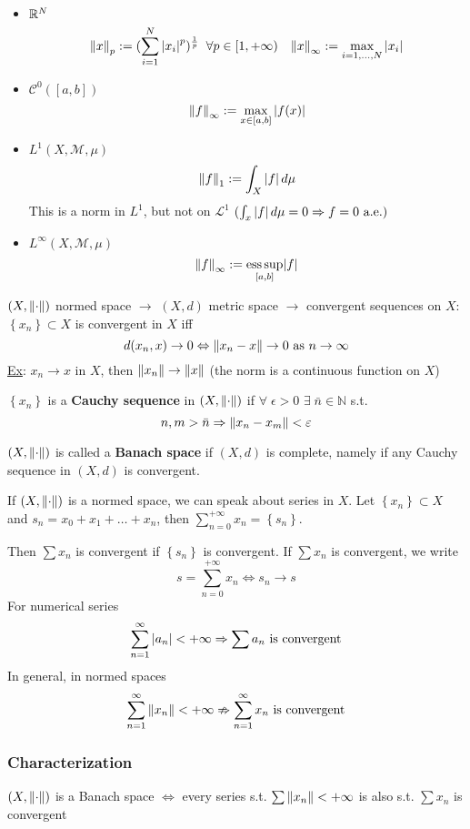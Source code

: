 \begin{itemize}
    \item \(\mathbb{R}^N\)
    \[
        \norm{x}_p := (\sum_{i = 1}^N \abs{x_i}^p)^{\frac{1}{p}} \; \; \forall p \in [1, +\infty) \quad
        \norm{x}_{\infty} := \max_{i = 1, \ldots, N} \abs{x_i}
    \]
    \item \(\mathcal{C}^0([a,b])\) \[\norm{f}_{\infty} := \max_{x \in [a,b]} \abs{f(x)}\]
    \item \(L^1(X, \mathcal{M}, \mu)\) \[\norm{f}_1 := \int_X \abs{f} \, d\mu\] This is a norm in \(L^1\), but not on \(\mathcal{L}^1\) \((\int_x \abs{f} \, d\mu = 0 \Rightarrow f = 0 \mbox{ a.e.})\)
    \item \(L^{\infty}(X, \mathcal{M}, \mu)\) \[\norm{f}_{\infty} := \underset{[a,b]}{\text{ess}\, \text{sup}} \abs{f}\]
\end{itemize}
\((X, \norm{\cdot})\) normed space \(\to\) \((X, d)\) metric space \(\to\) convergent sequences on \(X\): \(\left\{ x_n \right\} \subset X\) is convergent in \(X\) iff 
\[
    d(x_n, x) \to 0 \Leftrightarrow \norm{x_n -x} \to 0 \mbox{ as } n \to \infty
\]
\noindent\underline{Ex}: \(x_n \to x\) in \(X\), then \(\norm{x_n} \to \norm{x}\) (the norm is a continuous function on \(X\))
\begin{definition}
    \(\left\{ x_n \right\}\) is a \textbf{Cauchy sequence} in \((X, \norm{\cdot})\) if \(\forall \; \epsilon > 0\) \(\exists \; \bar{n} \in \mathbb{N}\) s.t. 
    \[
        n,m > \bar{n} \Rightarrow \norm{x_n-x_m} < \varepsilon
    \]
\end{definition}
\begin{definition}
    \((X, \norm{\cdot})\) is called a \textbf{Banach space} if \((X, d)\) is complete, namely if any Cauchy sequence in \((X, d)\) is convergent.
\end{definition}
If \((X, \norm{\cdot})\) is a normed space, we can speak about series in \(X\). Let \(\left\{ x_n \right\} \subset X\) and \(s_n = x_0 + x_1 + \ldots + x_n\), then \(\sum_{n=0}^{+\infty} x_n = \left\{ s_n \right\}\). 

Then \(\sum x_n\) is convergent if \(\left\{ s_n \right\}\) is convergent. If \(\sum x_n\) is convergent, we write 
\[
    s = \sum_{n = 0}^{+\infty} x_n \Leftrightarrow s_n \to s
\]
For numerical series
\[
    \sum_{n=1}^{\infty} \abs{a_n} < +\infty \Rightarrow \sum a_n \mbox{ is convergent}
\]
In general, in normed spaces 
\[
    \sum_{n=1}^{\infty} \norm{x_n} < +\infty \nRightarrow \sum_{n=1}^{\infty} x_n \mbox{ is convergent}
\]
\subsubsection*{Characterization}
\((X, \norm{\cdot})\) is a Banach space \(\Leftrightarrow\) every series s.t. \(\sum \norm{x_n} < +\infty\) is also s.t. \(\sum x_n\) is convergent